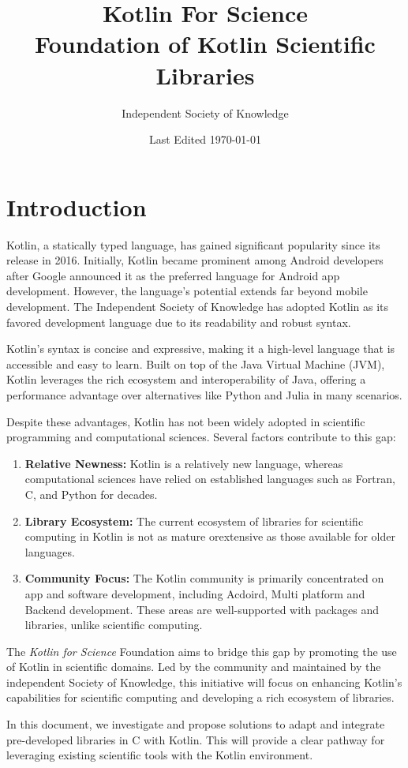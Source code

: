 \documentclass[10pt,twocolumn, a4paper]{article}
\title{Kotlin For Science \\ \large Foundation of Kotlin Scientific Libraries}
\author{Independent Society of Knowledge}
\date{Last Edited \today}
\begin{document}
\maketitle
\section{Introduction}
Kotlin, a statically typed language, has gained significant popularity since its release in 2016.
Initially, Kotlin became prominent among Android developers after Google announced it as the preferred language for Android app development.
However, the language's potential extends far beyond mobile development.
The Independent Society of Knowledge has adopted Kotlin as its favored development language due to its readability and robust syntax.

Kotlin's syntax is concise and expressive, making it a high-level language that is accessible and easy to learn.
Built on top of the Java Virtual Machine (JVM), Kotlin leverages the rich ecosystem and interoperability of Java, offering a performance advantage over alternatives like Python and Julia in many scenarios.

Despite these advantages, Kotlin has not been widely adopted in scientific programming and computational sciences. Several factors contribute to this gap:
\begin{enumerate}
	\item \textbf{Relative Newness:} Kotlin is a relatively new language, whereas computational sciences have relied on established languages such as Fortran, C, and Python for decades.
	\item \textbf{Library Ecosystem:} The current ecosystem of libraries for scientific computing in Kotlin is not as mature orextensive as those available for older languages.
	\item \textbf{Community Focus:} The Kotlin community is primarily concentrated on app and software development, including Acdoird, Multi platform and Backend development. These areas are well-supported with packages and libraries, unlike scientific computing.
\end{enumerate}
The \textit{Kotlin for Science} Foundation aims to bridge this gap by promoting the use of Kotlin in scientific domains. Led by the community and maintained by the independent Society of Knowledge, this initiative will focus on enhancing Kotlin's capabilities for scientific computing and developing a rich ecosystem of libraries.

In this document, we investigate and propose solutions to adapt and integrate pre-developed libraries in C with Kotlin. This will provide a clear pathway for leveraging existing scientific tools with the Kotlin environment.
\end{document}
